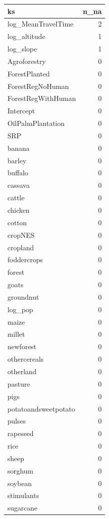 \documentclass[
]{article}
\begin{document}
\begin{longtable}[]{@{}lr@{}}
\toprule\noalign{}
ks & n\_na \\
\midrule\noalign{}
\endhead
\bottomrule\noalign{}
\endlastfoot
log\_MeanTravelTime & 2 \\
log\_altitude & 1 \\
log\_slope & 1 \\
Agroforestry & 0 \\
ForestPlanted & 0 \\
ForestRegNoHuman & 0 \\
ForestRegWithHuman & 0 \\
Intercept & 0 \\
OilPalmPlantation & 0 \\
SRP & 0 \\
banana & 0 \\
barley & 0 \\
buffalo & 0 \\
cassava & 0 \\
cattle & 0 \\
chicken & 0 \\
cotton & 0 \\
cropNES & 0 \\
cropland & 0 \\
foddercrops & 0 \\
forest & 0 \\
goats & 0 \\
groundnut & 0 \\
log\_pop & 0 \\
maize & 0 \\
millet & 0 \\
newforest & 0 \\
othercereals & 0 \\
otherland & 0 \\
pasture & 0 \\
pigs & 0 \\
potatoandsweetpotato & 0 \\
pulses & 0 \\
rapeseed & 0 \\
rice & 0 \\
sheep & 0 \\
sorghum & 0 \\
soybean & 0 \\
stimulants & 0 \\
sugarcane & 0 \\
\end{longtable}
\end{document}
